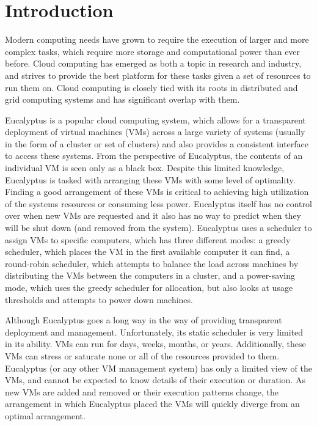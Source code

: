 \section{Introduction}
   Modern computing needs have grown to require the execution of larger and more complex tasks, which require more storage and computational power than ever before.  Cloud computing has emerged as both a topic in research and industry, and strives to provide the best platform for these tasks given a set of resources to run them on.  Cloud computing is closely tied with its roots in distributed and grid computing systems and has significant overlap with them.  

  Eucalyptus is a popular cloud computing system, which allows for a transparent deployment of virtual machines (VMs) across a large variety of systems (usually in the form of a cluster or set of clusters) and also provides a consistent interface to access these systems.  From the perspective of Eucalyptus, the contents of an individual VM is seen only as a black box.  Despite this limited knowledge, Eucalyptus is tasked with arranging these VMs with some level of optimality.  Finding a good arrangement of these VMs is critical to achieving high utilization of the systems resources or consuming less power.  Eucalyptus itself has no control over when new VMs are requested and it also has no way to predict when they will be shut down (and removed from the system).  Eucalyptus uses a scheduler to assign VMs to specific computers, which has three different modes: a greedy scheduler, which places the VM in the first available computer it can find, a round-robin scheduler, which attempts to balance the load across machines by distributing the VMs between the computers in a cluster, and a power-saving mode, which uses the greedy scheduler for allocation, but also looks at usage thresholds and attempts to power down machines.

  Although Eucalyptus goes a long way in the way of providing transparent deployment and management.  Unfortunately, its static scheduler is very limited in its ability.  VMs can run for days, weeks, months, or years.  Additionally, these VMs can stress or saturate none or all of the resources provided to them.  Eucalyptus (or any other VM management system) has only a limited view of the VMs, and cannot be expected to know details of their execution or duration.  As new VMs are added and removed or their execution patterns change, the arrangement in which Eucalyptus placed the VMs will quickly diverge from an optimal arrangement.

